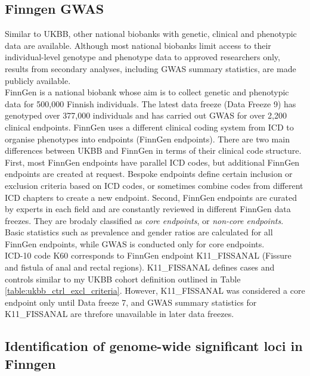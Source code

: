   



      \subsection{Finngen GWAS}
      Similar to UKBB, other national biobanks with genetic, clinical and phenotypic data are available. Although most national biobanks limit access to their individual-level genotype and phenotype data to approved researchers only, results from secondary analyses, including GWAS summary statistics, are made publicly available. \\

      FinnGen is a national biobank whose aim is to collect genetic and phenotypic data for 500,000 Finnish individuals. The latest data freeze (Data Freeze 9) has genotyped over 377,000 individuals and has carried out GWAS for over 2,200 clinical endpoints. FinnGen uses a different clinical coding system from ICD to organise phenotypes into endpoints (FinnGen endpoints). There are two main differences between UKBB and FinnGen in terms of their clinical code structure. First, most FinnGen endpoints have parallel ICD codes, but additional FinnGen endpoints are created at request. Bespoke endpoints define certain inclusion or exclusion criteria based on ICD codes, or sometimes combine codes from different ICD chapters to create a new endpoint. Second, FinnGen endpoints are curated by experts in each field and are constantly reviewed in different FinnGen data freezes. They are brodaly classified as \textit{core endpoints}, or \textit{non-core endpoints}. Basic statistics such as prevalence and gender ratios are calculated for all FinnGen endpoints, while GWAS is conducted only for core endpoints.\\

ICD-10 code K60 corresponds to FinnGen endpoint K11\_FISSANAL (Fissure and fistula of anal and rectal regions). K11\_FISSANAL defines cases and controls similar to my UKBB cohort definition outlined in Table \ref{table:ukbb_ctrl_excl_criteria}. However, K11\_FISSANAL was considered a core endpoint only until Data freeze 7, and GWAS summary statistics for K11\_FISSANAL are threfore unavailable in later data freezes. 

\subsection{Identification of genome-wide significant loci in Finngen}

